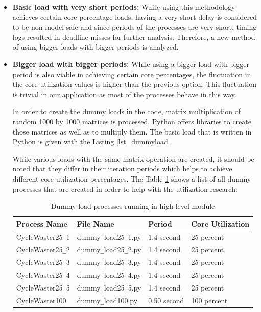 \begin{itemize}
	\item \textbf{Basic load with very short periods:} While using this methodology achieves certain core percentage loads, having a very short delay is considered to be non model-safe and since periods of the processes are very short, timing logs resulted in deadline misses for further analysis. Therefore, a new method of using bigger loads with bigger periods is analyzed.
	
	\item \textbf{Bigger load with bigger periods:} While using a bigger load with bigger period is also viable in achieving certain core percentages, the fluctuation in the core utilization values is higher than the previous option. This fluctuation is trivial in our application as most of the processes behave in this way.
	
	
	
	In order to create the dummy loads in the code, matrix multiplication of random 1000 by 1000 matrices is processed. Python offers libraries to create those matrices as well as to multiply them. The basic load that is written in Python is given with the Listing \ref{lst_dummyload}.
	
	While various loads with the same matrix operation are created, it should be noted that they differ in their iteration periods which helps to achieve different core utilization percentages. The Table \ref{tbl_dummyloads} shows a list of all dummy processes that are created in order to help with the utilization research:
	
	\begin{table}[h!]
		\begin{tabular}{|l|l|l|l|}
			\hline
			Process Name & File Name & Period & Core Utilization \\
			\hline
			\hline
			CycleWaster25\texttt{\_}1 & dummy\texttt{\_}load25\texttt{\_}1.py & 1.4 second & 25 percent \\
			\hline
			CycleWaster25\texttt{\_}2 & dummy\texttt{\_}load25\texttt{\_}2.py & 1.4 second &  25 percent \\
			\hline
			CycleWaster25\texttt{\_}3 & dummy\texttt{\_}load25\texttt{\_}3.py & 1.4 second &  25 percent \\
			\hline
			CycleWaster25\texttt{\_}4 & dummy\texttt{\_}load25\texttt{\_}4.py & 1.4 second &  25 percent \\
			\hline
			CycleWaster25\texttt{\_}5 & dummy\texttt{\_}load25\texttt{\_}5.py & 1.4 second &  25 percent \\
			\hline
			CycleWaster100 & dummy\texttt{\_}load100.py & 0.50 second & 100 percent \\
			\hline
		\end{tabular}
		\caption{Dummy load processes running in high-level module}
		\label{tbl_dummyloads}
	\end{table}
	
\end{itemize}

